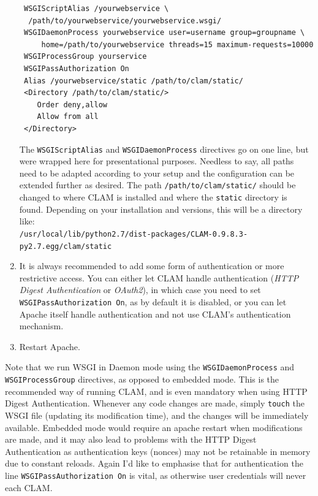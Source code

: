 \documentclass[a4paper,12pt]{report}
\begin{document}
\begin{enumerate}
\begin{verbatim}
 WSGIScriptAlias /yourwebservice \
  /path/to/yourwebservice/yourwebservice.wsgi/
 WSGIDaemonProcess yourwebservice user=username group=groupname \
     home=/path/to/yourwebservice threads=15 maximum-requests=10000
 WSGIProcessGroup yourservice
 WSGIPassAuthorization On
 Alias /yourwebservice/static /path/to/clam/static/ 
 <Directory /path/to/clam/static/>
    Order deny,allow
    Allow from all
 </Directory>
\end{verbatim}

The \texttt{WSGIScriptAlias} and \texttt{WSGIDaemonProcess} directives go on
one line, but were wrapped here
for presentational purposes. Needless to say, all paths need to be adapted
according to your setup and the configuration can be extended further as
desired. The path \texttt{/path/to/clam/static/} should be changed to where CLAM is
installed and where the \texttt{static} directory is found. Depending on your
installation and versions, this will be a directory like: \\
\texttt{/usr/local/lib/python2.7/dist-packages/CLAM-0.9.8.3-py2.7.egg/clam/static}

\item It is always recommended to add some form of authentication or more restrictive
  access. You can either let CLAM handle authentication (\emph{HTTP Digest
  Authentication} or \emph{OAuth2}), in which case you need to set \texttt{WSGIPassAuthorization
  On}, as by default it is disabled, or you can let Apache itself handle
  authentication and not use CLAM's authentication mechanism.  

\item Restart Apache. 
\end{enumerate}

Note that we run WSGI in Daemon mode using the \texttt{WSGIDaemonProcess} and
\texttt{WSGIProcessGroup} directives, as opposed to embedded mode. This is the
recommended way of running CLAM, and is even mandatory when using HTTP Digest
Authentication. Whenever any code changes are made, simply
\texttt{touch} the WSGI file (updating its modification time), and the changes
will be immediately available. Embedded mode would require an apache restart
when modifications are made, and it may also lead to problems with the HTTP
Digest Authentication as authentication keys (nonces) may not be retainable in
memory due to constant reloads.  Again I'd like to emphasise that for
authentication the line \texttt{WSGIPassAuthorization On} is vital, as
otherwise user credentials will never each CLAM.
\end{document}
